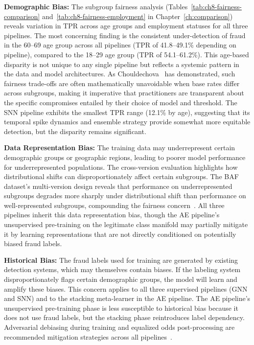 \textbf{Demographic Bias:} The subgroup fairness analysis (Tables~\ref{tab:ch8-fairness-comparison} and~\ref{tab:ch8-fairness-employment} in Chapter~\ref{ch:comparison}) reveals variation in TPR across age groups and employment statuses for all three pipelines. The most concerning finding is the consistent under-detection of fraud in the 60--69 age group across all pipelines (TPR of 41.8--49.1\% depending on pipeline), compared to the 18--29 age group (TPR of 54.1--61.2\%). This age-based disparity is not unique to any single pipeline but reflects a systemic pattern in the data and model architectures. As Chouldechova~\cite{chouldechova2017fair} has demonstrated, such fairness trade-offs are often mathematically unavoidable when base rates differ across subgroups, making it imperative that practitioners are transparent about the specific compromises entailed by their choice of model and threshold. The SNN pipeline exhibits the smallest TPR range (12.1\% by age), suggesting that its temporal spike dynamics and ensemble strategy provide somewhat more equitable detection, but the disparity remains significant.

\textbf{Data Representation Bias:} The training data may underrepresent certain demographic groups or geographic regions, leading to poorer model performance for underrepresented populations. The cross-version evaluation highlights how distributional shifts can disproportionately affect certain subgroups. The BAF dataset's multi-version design reveals that performance on underrepresented subgroups degrades more sharply under distributional shift than performance on well-represented subgroups, compounding the fairness concern~\cite{dai2021fair}. All three pipelines inherit this data representation bias, though the AE pipeline's unsupervised pre-training on the legitimate class manifold may partially mitigate it by learning representations that are not directly conditioned on potentially biased fraud labels.

\textbf{Historical Bias:} The fraud labels used for training are generated by existing detection systems, which may themselves contain biases. If the labeling system disproportionately flags certain demographic groups, the model will learn and amplify these biases. This concern applies to all three supervised pipelines (GNN and SNN) and to the stacking meta-learner in the AE pipeline. The AE pipeline's unsupervised pre-training phase is less susceptible to historical bias because it does not use fraud labels, but the stacking phase reintroduces label dependency. Adversarial debiasing during training and equalized odds post-processing are recommended mitigation strategies across all pipelines~\cite{kozodoi2022fairness}.

